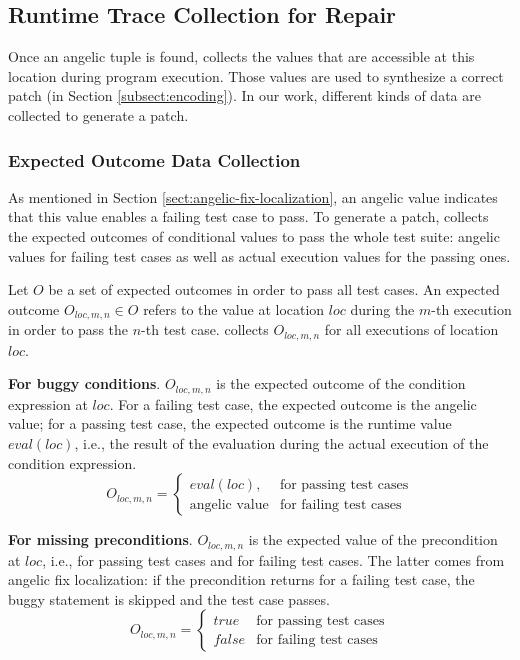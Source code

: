 \subsection{Runtime Trace Collection for Repair}
\label{sect:data-collection} 

Once an angelic tuple is found, \nopol collects the values that are accessible at this location during program execution. Those values are used to synthesize a correct patch (in Section \ref{subsect:encoding}). In our work, different kinds of data are collected to generate a patch.

\subsubsection{Expected Outcome Data Collection}
\label{subsubsect:outcome}

As mentioned in Section \ref{sect:angelic-fix-localization}, an angelic value indicates that this value enables a failing test case to pass. To generate a patch, \nopol collects the expected outcomes of conditional values to pass the whole test suite: angelic values for failing test cases as well as actual execution values for the passing ones. 

Let $O$ be a set of expected outcomes in order to pass all test cases. An expected outcome $O_{loc,m,n} \in O$ refers to the value at location $loc$ during the $m$-th execution in order to pass the $n$-th test case. \nopol collects $O_{loc,m,n}$ for all executions of location $loc$.

\textbf{For buggy \ourif conditions}. $O_{loc,m,n}$ is the expected outcome of the condition expression at $loc$.
For a failing test case, the expected outcome is the angelic value; 
for a passing test case, the expected outcome is the runtime value $eval(loc)$, i.e., the result of the evaluation during the actual execution of the \ourif condition expression.
$$ O_{loc,m,n} =
\begin{cases}
eval(loc), & \mbox{for passing test cases} \\
\mbox{angelic value} & \mbox{for failing test cases} 
\end{cases}
$$

\textbf{For missing preconditions}. $O_{loc,m,n}$ is the expected value of the precondition at $loc$, i.e.,  for passing test cases and  for failing test cases. The latter comes from angelic fix localization: if the precondition returns  for a failing test case, the buggy statement is skipped and the test case passes.
$$ O_{loc,m,n} =
\begin{cases}
true & \mbox{for passing test cases} \\
false & \mbox{for failing test cases} 
\end{cases}
$$
  
